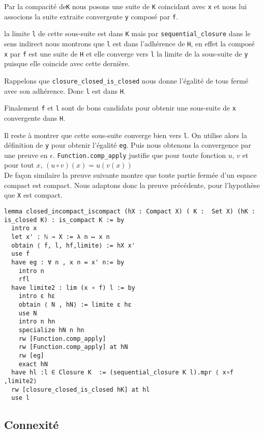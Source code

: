 \documentclass[a4paper, 12pt]{article}
\newcommand{\lean}[1]{\texttt{#1}}
\begin{document}
Par la compacité de\lean{K} nous posons une suite de \lean{K} coincidant avec \lean{x} et nous lui associons la suite extraite convergente \lean{y} composé par \lean{f}.

la limite \lean{l} de cette sous-suite est dans \lean{K} mais par \lean{sequential_closure} dans le sens indirect nous montrons que \lean{l} est dans l'adhérence de \lean{H}, en effet la composé \lean{x} par \lean{f} est une suite de \lean{H} et elle converge vers \lean{l} la limite de la sous-suite de \lean{y} puisque elle coincide avec cette dernière.

Rappelons que \lean{closure_closed_is_closed} nous donne l'égalité de tous fermé avec son adhérence. Donc \lean{l} est dans \lean{H}.

Finalement \lean{f} et \lean{l} sont de bons candidats pour obtenir une sous-suite de \lean{x} convergente dans \lean{H}.

Il reste à montrer que cette sous-suite converge bien vers \lean{l}. On utilise alors la définition de \lean{y} pour obtenir l'égalité \lean{eg}. Puis nous obtenons la convergence par une preuve en $\epsilon$. \lean{Function.comp_apply} justifie que pour toute fonction $u$, $v$ et pour tout $x$, $(u \circ v) (x) = u(v(x)) $ \\

De façon similaire la preuve suivante montre que toute partie fermée d'un espace compact est compact. Nous adaptons donc la preuve précédente, pour l'hypothèse que \lean{X} est compact.

\begin{verbatim}
lemma closed_incompact_iscompact (hX : Compact X) ( K :  Set X) (hK : is_closed K) : is_compact K := by
  intro x
  let x' : ℕ → X := λ n ↦ x n
  obtain ⟨ f, l, hf,limite⟩ := hX x'
  use f 
  have eg : ∀ n , x n = x' n:= by
    intro n
    rfl
  have limite2 : lim (x ∘ f) l := by
    intro ε hε 
    obtain ⟨ N , hN⟩ := limite ε hε 
    use N 
    intro n hn
    specialize hN n hn
    rw [Function.comp_apply]
    rw [Function.comp_apply] at hN
    rw [eg]
    exact hN
  have hl :l ∈ Closure K  := (sequential_closure K l).mpr ⟨ x∘f ,limite2⟩ 
  rw [closure_closed_is_closed hK] at hl
  use l
\end{verbatim}



\subsection{Connexité}

\newpage

\nocite{*}


\end{document}
